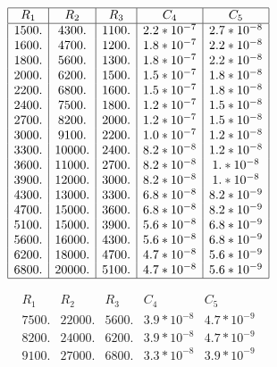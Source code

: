 \documentclass{llncs}
\begin{document}
	\begin{table}[!h]
          \begin{minipage}{0.5\textwidth}
$$
	  \begin{array}{|c|c|c|c|c|}
		\hline
		R_1    & R_2  & R_3   & C_4  & C_5 \\
		\hline
		1500. & 4300. & 1100. & 2.2*10^{-7} & 2.7*10^{-8} \\
		1600. & 4700. & 1200. & 1.8*10^{-7} & 2.2*10^{-8} \\
		1800. & 5600. & 1300. & 1.8*10^{-7} & 2.2*10^{-8} \\
		2000. & 6200. & 1500. & 1.5*10^{-7} & 1.8*10^{-8} \\
		2200. & 6800. & 1600. & 1.5*10^{-7} & 1.8*10^{-8} \\
		2400. & 7500. & 1800. & 1.2*10^{-7} & 1.5*10^{-8} \\
		2700. & 8200. & 2000. & 1.2*10^{-7} & 1.5*10^{-8} \\
		3000. & 9100. & 2200. & 1.0*10^{-7} & 1.2*10^{-8} \\
		3300. & 10000. & 2400. & 8.2*10^{-8} & 1.2*10^{-8} \\
		3600. & 11000. & 2700. & 8.2*10^{-8} & 1.*10^{-8} \\
		3900. & 12000. & 3000. & 8.2*10^{-8} & 1.*10^{-8} \\
		4300. & 13000. & 3300. & 6.8*10^{-8} & 8.2*10^{-9} \\
		4700. & 15000. & 3600. & 6.8*10^{-8} & 8.2*10^{-9} \\
		5100. & 15000. & 3900. & 5.6*10^{-8} & 6.8*10^{-9} \\
		5600. & 16000. & 4300. & 5.6*10^{-8} & 6.8*10^{-9} \\
		6200. & 18000. & 4700. & 4.7*10^{-8} & 5.6*10^{-9} \\
		6800. & 20000. & 5100. & 4.7*10^{-8} & 5.6*10^{-9} \\
		\hline
		\end{array}
		$$
                \end{minipage} \hfill
          \begin{minipage}{0.5\textwidth}
		$$
		\begin{array}{|c|c|c|c|c|}
		\hline
		R_1    & R_2  & R_3   & C_4                          & C_5 \\
		\hline
		7500. & 22000. & 5600. & 3.9*10^{-8} & 4.7*10^{-9} \\
		8200. & 24000. & 6200. & 3.9*10^{-8} & 4.7*10^{-9} \\
		9100. & 27000. & 6800. & 3.3*10^{-8} & 3.9*10^{-9} \\

\end{array}$$
\end{minipage}
\end{table}
\end{document}
